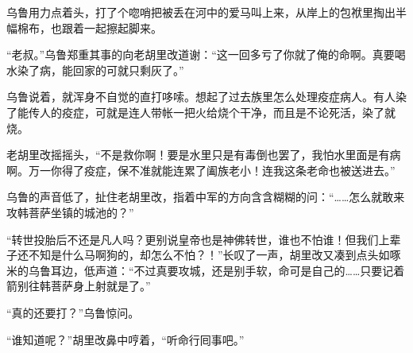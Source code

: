 乌鲁用力点着头，打了个唿哨把被丢在河中的爱马叫上来，从岸上的包袱里掏出半幅棉布，也跟着一起擦起脚来。

“老叔。”乌鲁郑重其事的向老胡里改道谢：“这一回多亏了你就了俺的命啊。真要喝水染了病，能回家的可就只剩灰了。”

乌鲁说着，就浑身不自觉的直打哆嗦。想起了过去族里怎么处理疫症病人。有人染了能传人的疫症，可就是连人带帐一把火给烧个干净，而且是不论死活，染了就烧。

老胡里改摇摇头，“不是救你啊！要是水里只是有毒倒也罢了，我怕水里面是有病啊。万一你得了疫症，保不准就能连累了阖族老小！连我这条老命也被送进去。”

乌鲁的声音低了，扯住老胡里改，指着中军的方向含含糊糊的问：“……怎么就敢来攻韩菩萨坐镇的城池的？”

“转世投胎后不还是凡人吗？更别说皇帝也是神佛转世，谁也不怕谁！但我们上辈子还不知是什么马啊狗的，却怎么不怕？！”长叹了一声，胡里改又凑到点头如啄米的乌鲁耳边，低声道：“不过真要攻城，还是别手软，命可是自己的……只要记着箭别往韩菩萨身上射就是了。”

“真的还要打？”乌鲁惊问。

“谁知道呢？”胡里改鼻中哼着，“听命行囘事吧。”
